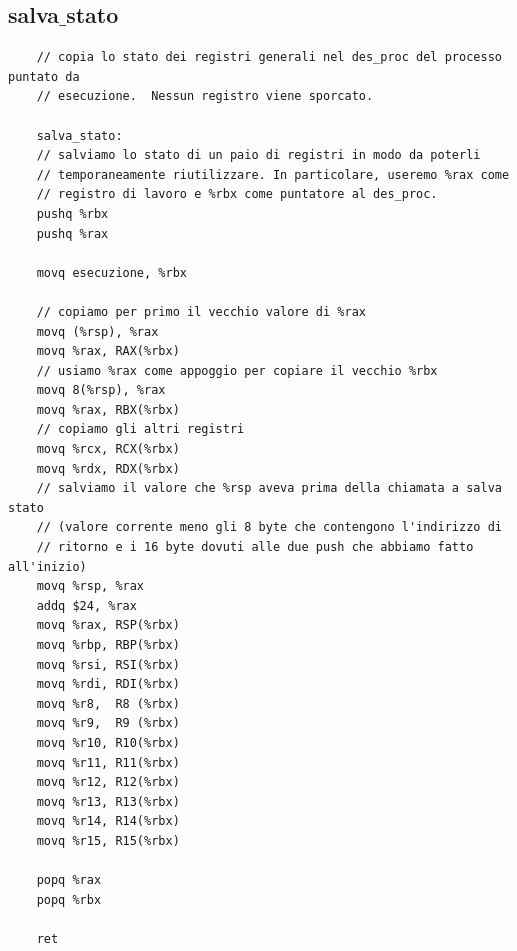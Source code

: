 \subsection{salva$\_$stato}	
\small 
\begin{verbatim}
	// copia lo stato dei registri generali nel des_proc del processo puntato da
	// esecuzione.  Nessun registro viene sporcato.
	
	salva_stato:
	// salviamo lo stato di un paio di registri in modo da poterli
	// temporaneamente riutilizzare. In particolare, useremo %rax come
	// registro di lavoro e %rbx come puntatore al des_proc.
	pushq %rbx
	pushq %rax
	
	movq esecuzione, %rbx
	
	// copiamo per primo il vecchio valore di %rax
	movq (%rsp), %rax
	movq %rax, RAX(%rbx)
	// usiamo %rax come appoggio per copiare il vecchio %rbx
	movq 8(%rsp), %rax
	movq %rax, RBX(%rbx)
	// copiamo gli altri registri
	movq %rcx, RCX(%rbx)
	movq %rdx, RDX(%rbx)
	// salviamo il valore che %rsp aveva prima della chiamata a salva stato
	// (valore corrente meno gli 8 byte che contengono l'indirizzo di
	// ritorno e i 16 byte dovuti alle due push che abbiamo fatto all'inizio)
	movq %rsp, %rax
	addq $24, %rax
	movq %rax, RSP(%rbx)
	movq %rbp, RBP(%rbx)
	movq %rsi, RSI(%rbx)
	movq %rdi, RDI(%rbx)
	movq %r8,  R8 (%rbx)
	movq %r9,  R9 (%rbx)
	movq %r10, R10(%rbx)
	movq %r11, R11(%rbx)
	movq %r12, R12(%rbx)
	movq %r13, R13(%rbx)
	movq %r14, R14(%rbx)
	movq %r15, R15(%rbx)
	
	popq %rax
	popq %rbx
	
	ret
\end{verbatim}
\normalsize 
